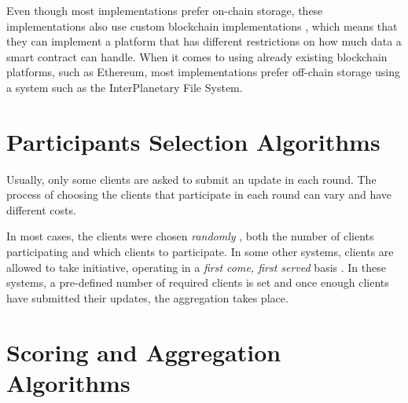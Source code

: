 
Even though most implementations prefer on-chain storage, these implementations also use custom blockchain implementations \cite{8733825, 9524833, 8894364, 9184854, 8893114}, which means that they can implement a platform that has different restrictions on how much data a smart contract can handle. When it comes to using already existing blockchain platforms, such as Ethereum, most implementations prefer off-chain storage using a system such as the InterPlanetary File System\cite{10.48550/arxiv.2007.03856, 8945913, Peyvandi2022, 9170559, 10.1145/3319535.3363256, 10.48550/arxiv.2011.07516}.

\section{Participants Selection Algorithms}\label{related_work:participants_selection}

Usually, only some clients are asked to submit an update in each round. The process of choosing the clients that participate in each round can vary and have different costs.

In most cases, the clients were chosen \textit{randomly} \cite{Peyvandi2022, demo, 9293091}, both the number of clients participating and which clients to participate. In some other systems, clients are allowed to take initiative, operating in a \textit{first come, first served} basis \cite{9184854, FANG20221}. In these systems, a pre-defined number of required clients is set and once enough clients have submitted their updates, the aggregation takes place.

\section{Scoring and Aggregation Algorithms}\label{related_work:scoring_techniques}

